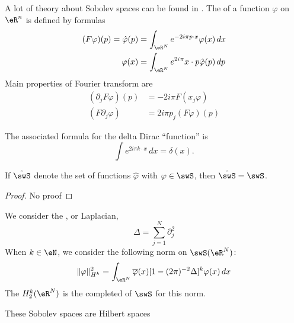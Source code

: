 A lot of theory about Sobolev spaces can be found in \cite{Maslov,Taylor_PDO}. The  of a function $\varphi$ on $\eR^n$ is defined by formulas
\begin{subequations}
\begin{align}
  (F\varphi)(p)=\hat\varphi(p)&=\int_{\eR^N} e^{-2i\pi p\cdot x}\varphi(x)\,dx\\
	\varphi(x)&=\int_{\eR^{N}} e^{2i\pi}x\cdot p\hat\varphi(p)\,dp
\end{align}
\end{subequations}
Main properties of Fourier transform are
\begin{subequations} \label{subeq_prop_Four}
\begin{align}
(\partial_jF\varphi)(p)&=-2i\pi F(x_j\varphi)\\
	(F\partial_j\varphi)&=2i\pi p_j(F\varphi)(p)
\end{align}
\end{subequations}

The associated formula for the delta Dirac ``function'' is 
\begin{equation}
  \int e^{2i\pi k\cdot x}\,dx=\delta(x).
\end{equation}

\begin{proposition}
If $\hat\swS$ denote the set of functions $\hat\varphi$ with $\varphi\in\swS$, then $\hat\swS=\swS$. 
\end{proposition}

\begin{proof}
No proof
\end{proof}

We consider the , or Laplacian,
\begin{equation}
\Delta=\sum_{j=1}^{N}\partial_j^2
\end{equation}
When $k\in\eN$, we consider the following norm on $\swS(\eR^N)$:
\begin{equation} \label{eq_def_norm_Sob}
  \| \varphi \|_{H^k}^2=\int_{\eR^N}\overline{\varphi}(x)[1-(2\pi)^{-2}\Delta]^k\varphi(x)\,dx
\end{equation}
The  $H^k_2(\eR^N)$ is the completed of $\swS$ for this norm.

\begin{proposition}
These Sobolev spaces are Hilbert spaces
\end{proposition}

